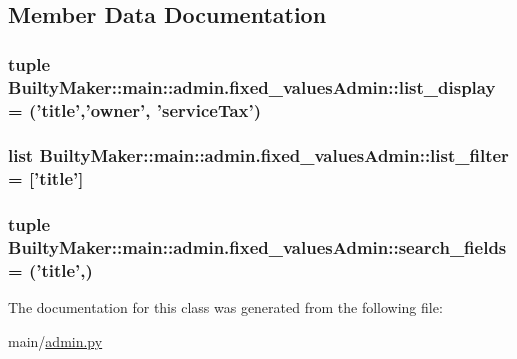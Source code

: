 \subsection{\-Member \-Data \-Documentation}
\hypertarget{classBuiltyMaker_1_1main_1_1admin_1_1fixed__valuesAdmin_a5fb4e268d2a80c96ea5b933c5ec17531}{
\subsubsection[{list\-\_\-display}]{\setlength{\rightskip}{0pt plus 5cm}tuple {\bf \-Builty\-Maker\-::main\-::admin.\-fixed\-\_\-values\-Admin\-::list\-\_\-display} = ('title','owner', 'service\-Tax')}}\label{classBuiltyMaker_1_1main_1_1admin_1_1fixed__valuesAdmin_a5fb4e268d2a80c96ea5b933c5ec17531}
\hypertarget{classBuiltyMaker_1_1main_1_1admin_1_1fixed__valuesAdmin_a98e84521b3447583946e42c94983b812}{
\subsubsection[{list\-\_\-filter}]{\setlength{\rightskip}{0pt plus 5cm}list {\bf \-Builty\-Maker\-::main\-::admin.\-fixed\-\_\-values\-Admin\-::list\-\_\-filter} = \mbox{[}'title'\mbox{]}}}\label{classBuiltyMaker_1_1main_1_1admin_1_1fixed__valuesAdmin_a98e84521b3447583946e42c94983b812}
\hypertarget{classBuiltyMaker_1_1main_1_1admin_1_1fixed__valuesAdmin_ae83a8685d5f6890591611fe68eba5238}{
\subsubsection[{search\-\_\-fields}]{\setlength{\rightskip}{0pt plus 5cm}tuple {\bf \-Builty\-Maker\-::main\-::admin.\-fixed\-\_\-values\-Admin\-::search\-\_\-fields} = ('title',)}}\label{classBuiltyMaker_1_1main_1_1admin_1_1fixed__valuesAdmin_ae83a8685d5f6890591611fe68eba5238}


\-The documentation for this class was generated from the following file\-:\begin{DoxyCompactItemize}
\item 
main/\hyperlink{admin_8py}{admin.\-py}\end{DoxyCompactItemize}
